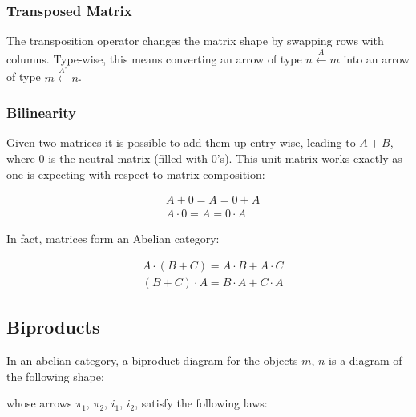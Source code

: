 \documentclass[
  oneside,
  11pt, a4paper,
  footinclude=true,
  headinclude=true,
  cleardoublepage=empty
]{scrbook}
\theoremstyle{definition}
\theoremstyle{definition}
\begin{document}
             \subsubsection{Transposed Matrix} The transposition operator changes the matrix shape by swapping rows with columns. Type-wise, this means converting an arrow of type $n \xleftarrow{A} m$ into an arrow of type $m \xleftarrow{A^\circ} n$.
            
            \subsubsection{Bilinearity} Given two matrices it is possible to add them up entry-wise, leading to $A + B$, where $0$ is the neutral matrix (filled with $0$'s). This unit matrix works exactly as one is expecting with respect to matrix composition:
            
            \begin{align*}
                & A + 0 = A = 0 + A \\
                & A \cdot 0 = A = 0 \cdot A
            \end{align*}
            
            In fact, matrices form an Abelian category:
            
            \begin{align*}
                & A \cdot (B + C) = A \cdot B + A \cdot C\\
                & (B + C) \cdot A = B \cdot A + C \cdot A
            \end{align*}
    
        \subsection{Biproducts}
        
        In an abelian category, a biproduct diagram for the objects $m$, $n$ is a diagram of the following shape:
        
        \begin{center}
        \end{center}{}
        
        whose arrows $\pi_1$, $\pi_2$, $i_1$, $i_2$, satisfy the following laws:
        
\end{document}
